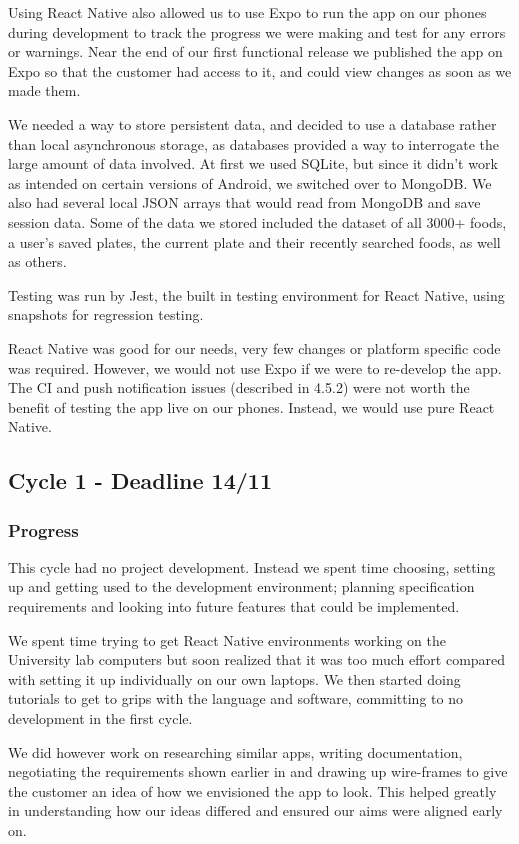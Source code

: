 \documentclass{l3proj}
\begin{document}
Using React Native also allowed us to use Expo to run the app on our phones during development to track the progress we were making and test for any errors or warnings. Near the end of our first functional release we published the app on Expo so that the customer had access to it, and could view changes as soon as we made them.

We needed a way to store persistent data, and decided to use a database rather than local asynchronous storage, as databases provided a way to interrogate the large amount of data involved. At first we used SQLite, but since it didn't work as intended on certain versions of Android, we switched over to MongoDB. We also had several local JSON arrays that would read from MongoDB and save session data. Some of the data we stored included the dataset of all 3000+ foods, a user's saved plates, the current plate and their recently searched foods, as well as others.

Testing was run by Jest, the built in testing environment for React Native, using snapshots for regression testing.

React Native was good for our needs, very few changes or platform specific code was required. However, we would not use Expo if we were to re-develop the app. The CI and push notification issues (described in 4.5.2) were not worth the benefit of testing the app live on our phones. Instead, we would use pure React Native.

\subsection{Cycle 1 - Deadline 14/11}
\subsubsection{Progress}
This cycle had no project development. Instead we spent time choosing, setting up and getting used to the development environment; planning specification requirements and looking into future features that could be implemented. 

We spent time trying to get React Native environments working on the University lab computers but soon realized that it was too much effort compared with setting it up individually on our own laptops. We then started doing tutorials to get to grips with the language and software, committing to no development in the first cycle. 

We did however work on researching similar apps, writing documentation, negotiating the requirements shown earlier in  and drawing up wire-frames to give the customer an idea of how we envisioned the app to look. This helped greatly in understanding how our ideas differed and ensured our aims were aligned early on.
\end{document}
